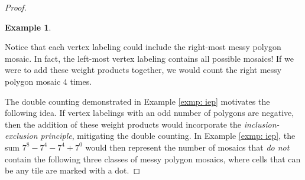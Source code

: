 \documentclass[12pt]{article}
\theoremstyle{plain}
\theoremstyle{definition}
\theoremstyle{remark}
\theoremstyle{definition}
\newtheorem{exmp}{Example}[section]
\newcommand{\cell}[4]{ \draw[thick] ( #1 , #2 ) rectangle ( #3 , #4 );}
\newcommand{\cellA}[4]{\draw[red, thick, densely dotted] ( #1 + 0.5 , #2 ) arc(0:90:{0.5}); \draw[thick] ( #1 , #2 ) rectangle ( #3 , #4 );}
\newcommand{\cellB}[4]{\draw[red, thick, densely dotted] ( #1 + 1 , #2 + 0.5 ) arc(90:180:{0.5}); \draw[thick] ( #1 , #2 ) rectangle ( #3 , #4 );}
\newcommand{\cellC}[4]{\draw[red, thick, densely dotted] ( #1 + 0.5, #2 + 1 ) arc(180:270:{0.5}); \draw[thick] ( #1 , #2 ) rectangle ( #3 , #4 );}
\newcommand{\cellD}[4]{\draw[red, thick, densely dotted] ( #1 , #2 + 0.5 ) arc(-90:0:{0.5}); \draw[thick] ( #1 , #2 ) rectangle ( #3 , #4 );}
\newcommand{\lablnode}[3]{\node[shape=circle,draw=none,fill=none, inner sep=0pt,minimum size=5pt] (A) at ( #1 , #2 ) {#3};}
\newcommand{\lablvertex}[3]{\node[shape=circle,draw=none,fill=white, inner sep=2pt,minimum size=5pt] (A) at ( #1 , #2 ) {#3};}
\begin{document}
\begin{proof}
\begin{exmp}
\begin{center}
\end{center}

Notice that each vertex labeling could include the right-most messy polygon mosaic. In fact, the left-most vertex labeling contains all possible mosaics! If we were to add these weight products together, we would count the right messy polygon mosaic $4$ times.

\end{exmp}

The double counting demonstrated in Example \ref{exmp: iep} motivates the following idea. If vertex labelings with an odd number of polygons are negative, then the addition of these weight products would incorporate the \textit{inclusion-exclusion principle}, mitigating the double counting. In Example \ref{exmp: iep}, the sum $7^8 - 7^4 - 7^4 + 7^0$ would then represent the number of mosaics that \textit{do not} contain the following three classes of messy polygon mosaics, where cells that can be any tile are marked with a dot.


\end{proof}
\end{document}

